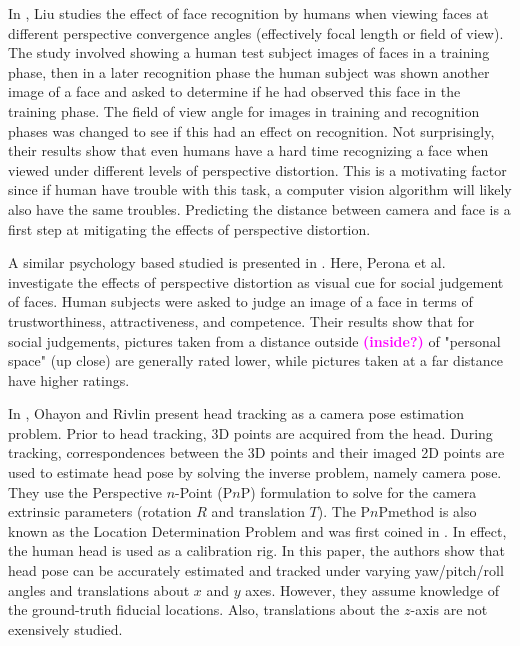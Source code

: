 \documentclass[runningheads]{llncs}
\newcommand {\ericnote} [1] {{\bf \textcolor{magenta}{(#1)}}}
\newcommand {\PnP} {P$n$P}
\begin{document}
In \cite{liu2003face,liu2006face}, Liu studies the effect of face recognition by humans when viewing faces at different perspective convergence angles (effectively focal length or field of view). 
The study involved showing a human test subject images of faces in a training phase, then in a later recognition phase the human subject was shown another image of a face and asked to determine if he had observed this face in the training phase. 
The field of view angle for images in training and recognition phases was changed to see if this had an effect on recognition. 
Not surprisingly, their results show that even humans have a hard time recognizing a face when viewed under different levels of perspective distortion.  
This is a motivating factor since if human have trouble with this task, a computer vision algorithm will likely also have the same troubles.  
Predicting the distance between camera and face is a first step at mitigating the effects of perspective distortion.

A similar psychology based studied is presented in \cite{perona2007new,bryan2012perspective}. 
Here, Perona et al. investigate the effects of perspective distortion as visual cue for social judgement of faces.  
Human subjects were asked to judge an image of a face in terms of trustworthiness, attractiveness, and competence.  
Their results show that for social judgements, pictures taken from a distance outside \ericnote{inside?} of "personal space" (up close) are generally rated lower, while pictures taken at a far distance have higher ratings.

In \cite{ohayon2006robust}, Ohayon and Rivlin present head tracking as a camera pose estimation problem.  
Prior to head tracking, 3D points are acquired from the head.  
During tracking, correspondences between the 3D points and their imaged 2D points are used to estimate head pose by solving the inverse problem, namely camera pose. 
They use the Perspective $n$-Point (\PnP) formulation to solve for the camera extrinsic parameters (rotation $R$ and translation $T$).  
The \PnP method is also known as the Location Determination Problem and was first coined in \cite{ransac}.  
In effect, the human head is used as a calibration rig.  
In this paper, the authors show that head pose can be accurately estimated and tracked under varying yaw/pitch/roll angles and translations about $x$ and $y$ axes. 
However, they assume knowledge of the ground-truth fiducial locations.
Also, translations about the $z$-axis are not exensively studied.  
\end{document}
